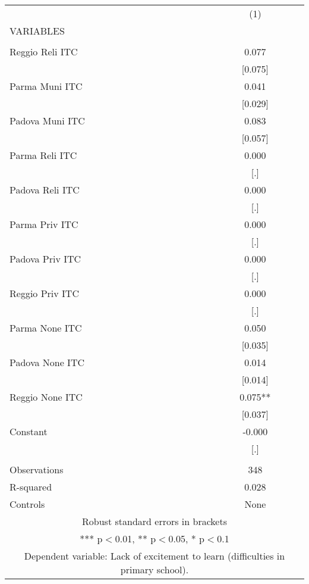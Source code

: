 \begin{tabular}{lc} \hline
 & (1) \\
VARIABLES &  \\ \hline
 &  \\
Reggio Reli ITC & 0.077 \\
 & [0.075] \\
Parma Muni ITC & 0.041 \\
 & [0.029] \\
Padova Muni ITC & 0.083 \\
 & [0.057] \\
Parma Reli ITC & 0.000 \\
 & [.] \\
Padova Reli ITC & 0.000 \\
 & [.] \\
Parma Priv ITC & 0.000 \\
 & [.] \\
Padova Priv ITC & 0.000 \\
 & [.] \\
Reggio Priv ITC & 0.000 \\
 & [.] \\
Parma None ITC & 0.050 \\
 & [0.035] \\
Padova None ITC & 0.014 \\
 & [0.014] \\
Reggio None ITC & 0.075** \\
 & [0.037] \\
Constant & -0.000 \\
 & [.] \\
 &  \\
Observations & 348 \\
R-squared & 0.028 \\
 Controls & None \\ \hline
\multicolumn{2}{c}{ Robust standard errors in brackets} \\
\multicolumn{2}{c}{ *** p$<$0.01, ** p$<$0.05, * p$<$0.1} \\
\multicolumn{2}{c}{ Dependent variable: Lack of excitement to learn (difficulties in primary school).} \\
\end{tabular}
